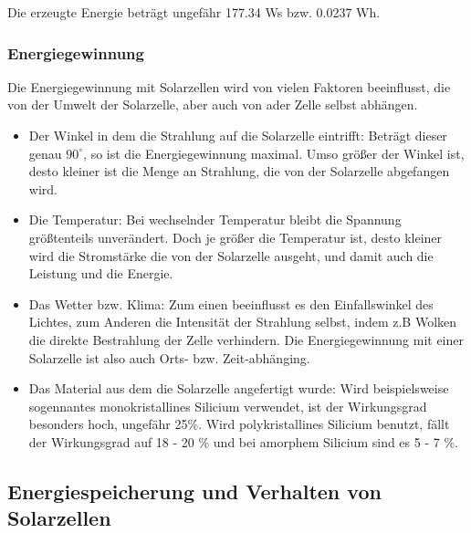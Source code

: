 \documentclass{etit-workshop-protokoll}
\begin{document}
        Die erzeugte Energie beträgt ungefähr 177.34 Ws bzw. 0.0237 Wh.

    \subsubsection{Energiegewinnung}                                    %
        \par Die Energiegewinnung mit Solarzellen wird von vielen Faktoren beeinflusst, die von der Umwelt der Solarzelle, aber auch von ader Zelle selbst abhängen.
        \begin{itemize}
            \item Der Winkel in dem die Strahlung auf die Solarzelle eintrifft: Beträgt dieser genau $90^{\circ}$, so ist die Energiegewinnung maximal. Umso größer der Winkel ist, desto kleiner ist die Menge an Strahlung, die von der Solarzelle abgefangen wird.
            \item Die Temperatur: Bei wechselnder Temperatur bleibt die Spannung größtenteils unverändert. Doch je größer die Temperatur ist, desto kleiner wird die Stromstärke die von der Solarzelle ausgeht, und damit auch die Leistung und die Energie.
            \item Das Wetter bzw. Klima: Zum einen beeinflusst es den Einfallswinkel des Lichtes, zum Anderen die Intensität der Strahlung selbst, indem z.B Wolken die direkte Bestrahlung der Zelle verhindern. Die Energiegewinnung mit einer Solarzelle ist also auch Orts- bzw. Zeit-abhänging.
            \item Das Material aus dem die Solarzelle angefertigt wurde: Wird beispielsweise sogennantes monokristallines Silicium verwendet, ist der Wirkungsgrad besonders hoch, ungefähr 25\%. Wird polykristallines Silicium benutzt, fällt der Wirkungsgrad auf 18 - 20 \% und bei amorphem Silicium sind es 5 - 7 \%. 
        \end{itemize}
\subsection {Energiespeicherung und Verhalten von Solarzellen}      %
\end{document}
